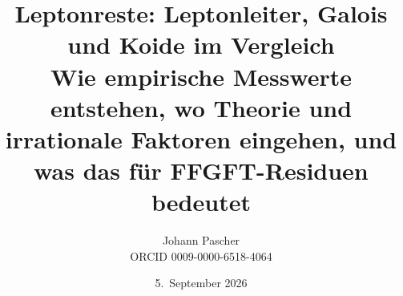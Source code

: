 \documentclass[11pt,a4paper]{report}
\title{Leptonreste: Leptonleiter, Galois und Koide im Vergleich\\[0.5em]
  \large Wie empirische Messwerte entstehen, wo Theorie und irrationale Faktoren
  eingehen, und was das für FFGFT-Residuen bedeutet}
\date{5.~September 2026}
\author{Johann Pascher\\\small ORCID 0009-0000-6518-4064}
\begin{document}
\renewcommand{\thechapter}{}
\renewcommand{\thesection}{\arabic{section}}
\maketitle
\tableofcontents

\end{document}
